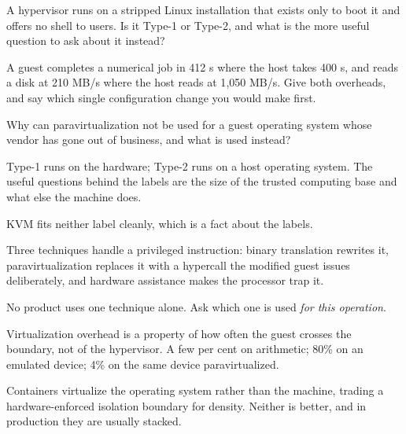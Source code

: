 \begin{checkpoint}
\begin{tightnum}
  \item A hypervisor runs on a stripped Linux installation that exists only to
        boot it and offers no shell to users. Is it Type-1 or Type-2, and what
        is the more useful question to ask about it instead?
  \item A guest completes a numerical job in 412 s where the host takes 400 s,
        and reads a disk at 210 MB/s where the host reads at 1{,}050 MB/s.
        Give both overheads, and say which single configuration change you
        would make first.
  \item Why can paravirtualization not be used for a guest operating system
        whose vendor has gone out of business, and what is used instead?
\end{tightnum}
\end{checkpoint}

\begin{chaptersummary}
\begin{tight}
  \item Type-1 runs on the hardware; Type-2 runs on a host operating system.
        The useful questions behind the labels are the size of the trusted
        computing base and what else the machine does.
  \item KVM fits neither label cleanly, which is a fact about the labels.
  \item Three techniques handle a privileged instruction: binary translation
        rewrites it, paravirtualization replaces it with a hypercall the
        modified guest issues deliberately, and hardware assistance makes the
        processor trap it.
  \item No product uses one technique alone. Ask which one is used \emph{for
        this operation}.
  \item Virtualization overhead is a property of how often the guest crosses
        the boundary, not of the hypervisor. A few per cent on arithmetic;
        80\% on an emulated device; 4\% on the same device paravirtualized.
  \item Containers virtualize the operating system rather than the machine,
        trading a hardware-enforced isolation boundary for density. Neither is
        better, and in production they are usually stacked.
\end{tight}
\end{chaptersummary}


